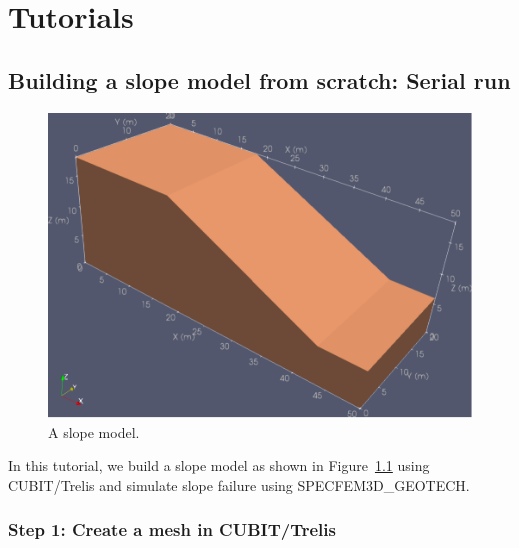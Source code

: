 \chapter{Tutorials}
\label{chap:tut}

\section{Building a slope model from scratch: Serial run}
\label{sec:cubit}

\begin{figure}[ht]
\centering
\includegraphics[scale=0.7]{cubit_example}
\caption{A slope model.}
\label{fig:slope}
\end{figure}

In this tutorial, we build a slope model as shown in Figure~\ref{fig:slope} using CUBIT/Trelis and simulate slope failure using SPECFEM3D\_GEOTECH.

\subsection*{Step 1: Create a mesh in CUBIT/Trelis}

